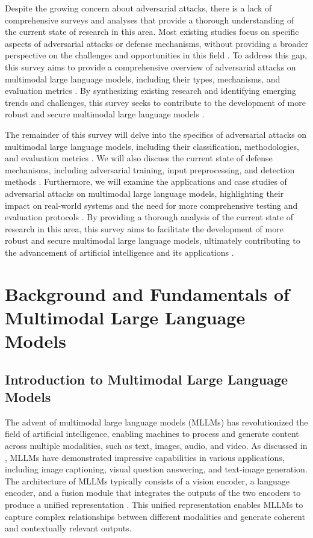 \documentclass[11pt,a4paper]{article}
\begin{document}
Despite the growing concern about adversarial attacks, there is a lack of comprehensive surveys and analyses that provide a thorough understanding of the current state of research in this area. Most existing studies focus on specific aspects of adversarial attacks or defense mechanisms, without providing a broader perspective on the challenges and opportunities in this field \cite{arxiv:2409.18991}. To address this gap, this survey aims to provide a comprehensive overview of adversarial attacks on multimodal large language models, including their types, mechanisms, and evaluation metrics \cite{arxiv:2503.13962}. By synthesizing existing research and identifying emerging trends and challenges, this survey seeks to contribute to the development of more robust and secure multimodal large language models \cite{arxiv:2412.02104}.

The remainder of this survey will delve into the specifics of adversarial attacks on multimodal large language models, including their classification, methodologies, and evaluation metrics \cite{arxiv:2408.08632}. We will also discuss the current state of defense mechanisms, including adversarial training, input preprocessing, and detection methods \cite{arxiv:2309.00614}. Furthermore, we will examine the applications and case studies of adversarial attacks on multimodal large language models, highlighting their impact on real-world systems and the need for more comprehensive testing and evaluation protocols \cite{arxiv:2402.14154}. By providing a thorough analysis of the current state of research in this area, this survey aims to facilitate the development of more robust and secure multimodal large language models, ultimately contributing to the advancement of artificial intelligence and its applications \cite{doi:10.1145/3764113}.


\section{Background and Fundamentals of Multimodal Large Language Models}



\subsection{Introduction to Multimodal Large Language Models}


The advent of multimodal large language models (MLLMs) has revolutionized the field of artificial intelligence, enabling machines to process and generate content across multiple modalities, such as text, images, audio, and video. As discussed in \cite{doi:10.1109/bigdata59044.2023.10386743}, MLLMs have demonstrated impressive capabilities in various applications, including image captioning, visual question answering, and text-image generation. The architecture of MLLMs typically consists of a vision encoder, a language encoder, and a fusion module that integrates the outputs of the two encoders to produce a unified representation \cite{doi:10.1109/iccvw60793.2023.00395}. This unified representation enables MLLMs to capture complex relationships between different modalities and generate coherent and contextually relevant outputs.
\end{document}
